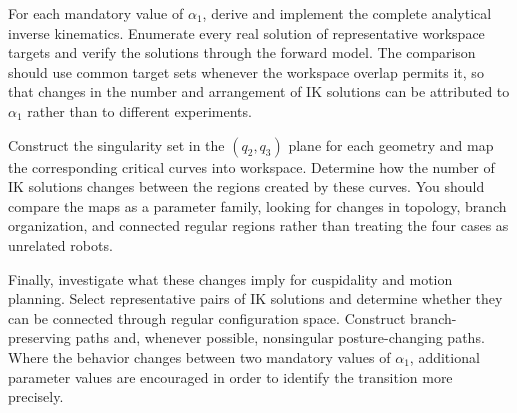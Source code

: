 \documentclass[11pt,a4paper]{article}
\begin{document}
For each mandatory value of $\alpha_1$, derive and implement the complete analytical inverse kinematics. Enumerate every real solution of representative workspace targets and verify the solutions through the forward model. The comparison should use common target sets whenever the workspace overlap permits it, so that changes in the number and arrangement of IK solutions can be attributed to $\alpha_1$ rather than to different experiments.

Construct the singularity set in the $(q_2,q_3)$ plane for each geometry and map the corresponding critical curves into workspace. Determine how the number of IK solutions changes between the regions created by these curves. You should compare the maps as a parameter family, looking for changes in topology, branch organization, and connected regular regions rather than treating the four cases as unrelated robots.

Finally, investigate what these changes imply for cuspidality and motion planning. Select representative pairs of IK solutions and determine whether they can be connected through regular configuration space. Construct branch-preserving paths and, whenever possible, nonsingular posture-changing paths. Where the behavior changes between two mandatory values of $\alpha_1$, additional parameter values are encouraged in order to identify the transition more precisely.
\end{document}
